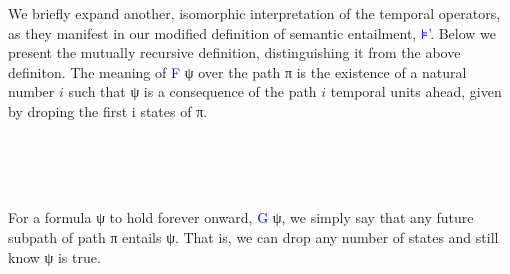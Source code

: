 \documentclass[a4paper, 11pt]{article}
\newcommand{\blue}[1]{\textcolor{blue}{#1}}
\begin{document}
We briefly expand another, isomorphic interpretation of the temporal operators,
as they manifest in our modified definition of semantic entailment, \blue{⊧'}.
Below we present the mutually recursive definition, distinguishing it from the
above definiton. The meaning of \blue{F} ψ over the path π is the existence of a
natural number $i$ such that ψ is a consequence of the path $i$ temporal units
ahead, given by droping the first i states of π.

\begin{code}[hide]%
\>[0]\<%
\end{code}
\begin{code}%
\>[0][@{}l@{\AgdaIndent{1}}]%
\>[2]\<%
\\
%
\\[\AgdaEmptyExtraSkip]%
\>[2][@{}l@{\AgdaIndent{0}}]%
\>[4]\AgdaSpace{}%
\AgdaSymbol{:}\AgdaSpace{}%
\AgdaSpace{}%
\AgdaSpace{}%
\AgdaSpace{}%
\AgdaSpace{}%
\<%
\\
%
\>[4]\AgdaSpace{}%
\AgdaSpace{}%
\AgdaSpace{}%
\AgdaSymbol{=}\AgdaSpace{}%
\AgdaFunction{Σ[}\AgdaSpace{}%
\AgdaSpace{}%
\AgdaSpace{}%
\AgdaSpace{}%
\AgdaFunction{]}\AgdaSpace{}%
\AgdaSymbol{(}\AgdaSpace{}%
\AgdaSpace{}%
\AgdaSymbol{)}\AgdaSpace{}%
\AgdaSpace{}%
\<%
\end{code}

For a formula ψ to hold forever onward, \blue{G} ψ, we simply say that any future
subpath of path π entails ψ. That is, we can drop any number of states and still
know ψ is true.

\begin{code}%
%
\>[4]\AgdaSpace{}%
\AgdaSymbol{:}\AgdaSpace{}%
\AgdaSpace{}%
\AgdaSpace{}%
\AgdaSpace{}%
\AgdaSpace{}%
\<%
\\
%
\>[4]\AgdaSpace{}%
\AgdaSpace{}%
\AgdaSpace{}%
\AgdaSymbol{=}\AgdaSpace{}%
\AgdaSpace{}%
\AgdaSpace{}%
\AgdaSpace{}%
\AgdaSymbol{(}\AgdaSpace{}%
\AgdaSpace{}%
\AgdaSymbol{)}\AgdaSpace{}%
\AgdaSpace{}%
\<%
\end{code}
\end{document}
